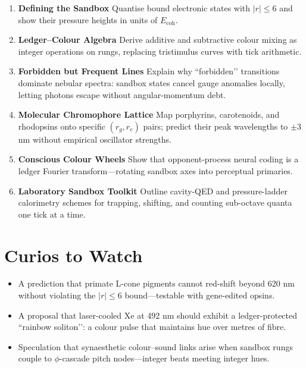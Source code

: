 \documentclass[11pt,oneside]{book}
\begin{document}
{\begin{enumerate}[label=\textbf{\arabic*.},leftmargin=1.25cm]
\item \textbf{Defining the Sandbox}  
      Quantise bound electronic states with \(|r|\!\le\!6\) and show
      their pressure heights in units of \(E_{\text{coh}}\).
\item \textbf{Ledger–Colour Algebra}  
      Derive additive and subtractive colour mixing as integer
      operations on rungs, replacing tristimulus curves with tick
      arithmetic.
\item \textbf{Forbidden but Frequent Lines}  
      Explain why “forbidden’’ transitions dominate nebular spectra:
      sandbox states cancel gauge anomalies locally, letting photons
      escape without angular-momentum debt.
\item \textbf{Molecular Chromophore Lattice}  
      Map porphyrins, carotenoids, and rhodopsins onto specific
      \((r_g,r_e)\) pairs; predict their peak wavelengths to
      \(\pm3\) nm without empirical oscillator strengths.
\item \textbf{Conscious Colour Wheels}  
      Show that opponent-process neural coding is a ledger Fourier
      transform—rotating sandbox axes into perceptual primaries.
\item \textbf{Laboratory Sandbox Toolkit}  
      Outline cavity-QED and pressure-ladder calorimetry schemes for
      trapping, shifting, and counting sub-octave quanta one tick at a
      time.
\end{enumerate}

\section*{Curios to Watch}

\begin{itemize}
\item A prediction that primate L-cone pigments cannot red-shift beyond
      620 nm without violating the \(|r|\!\le\!6\) bound—testable with
      gene-edited opsins.  
\item A proposal that laser-cooled Xe at 492 nm should exhibit a
      ledger-protected “rainbow soliton’’: a colour pulse that maintains
      hue over metres of fibre.  
\item Speculation that synaesthetic colour–sound links arise when
      sandbox rungs couple to \(\phi\)-cascade pitch nodes—integer beats
      meeting integer hues.
\end{itemize}

}
\end{document}
